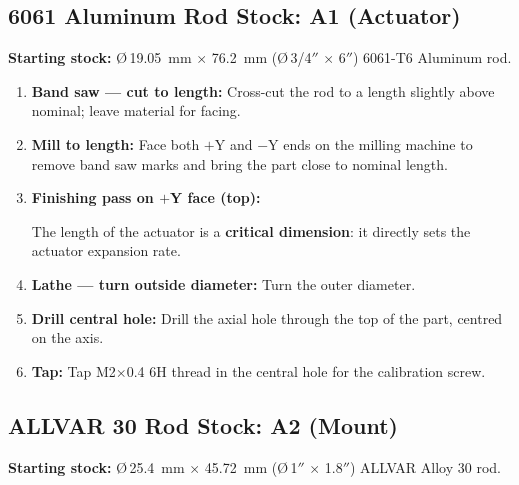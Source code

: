 \documentclass[12pt, letterpaper]{report}%
\newcounter{mycounter}           %
\newcounter{sub}[mycounter]      %
\begin{document}
\subsection{6061 Aluminum Rod Stock: A1 (Actuator)}
\label{sec:mfg:A1}

\textbf{Starting stock:}
\O\,\SI{19.05}{\milli\meter} $\times$ \SI{76.2}{\milli\meter}
(\O\,3/4$''$ $\times$ 6$''$) 6061-T6 Aluminum rod.

\begin{enumerate}[itemsep=4pt]
	\item \textbf{Band saw --- cut to length:} Cross-cut the rod to a length slightly
				above nominal; leave material for facing.
	\item \textbf{Mill to length:} Face both $+$Y and $-$Y ends on the milling
				machine to remove band saw marks and bring the part close to nominal length.
	\item \textbf{Finishing pass on $+$Y face (top):}
				\begin{notebox}
				The length of the actuator is a
				\textbf{critical dimension}: it directly sets the actuator expansion rate.
				\end{notebox}
	\item \textbf{Lathe --- turn outside diameter:} Turn the outer diameter.
	\item \textbf{Drill central hole:} Drill the axial hole
				through the top of the part, centred on the axis.
	\item \textbf{Tap:} Tap M2$\times$0.4 6H thread in the central hole for the
				calibration screw.
\end{enumerate}

\subsection{ALLVAR 30 Rod Stock: A2 (Mount)}
\label{sec:mfg:A2}

\textbf{Starting stock:}
\O\,\SI{25.4}{\milli\meter} $\times$ \SI{45.72}{\milli\meter}
(\O\,1$''$ $\times$ 1.8$''$) ALLVAR Alloy 30 rod.
\end{document}
